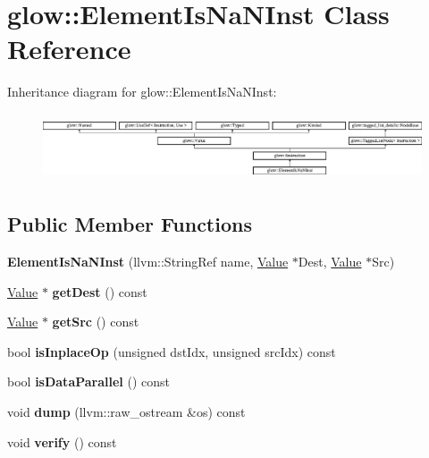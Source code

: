 \hypertarget{classglow_1_1_element_is_na_n_inst}{}\section{glow\+:\+:Element\+Is\+Na\+N\+Inst Class Reference}
\label{classglow_1_1_element_is_na_n_inst}
Inheritance diagram for glow\+:\+:Element\+Is\+Na\+N\+Inst\+:\begin{figure}[H]
\begin{center}
\leavevmode
\includegraphics[height=1.991111cm]{classglow_1_1_element_is_na_n_inst}
\end{center}
\end{figure}
\subsection*{Public Member Functions}
\begin{DoxyCompactItemize}
\item 
\mbox{\label{classglow_1_1_element_is_na_n_inst_a7c13e84e486e559f42c8a6dc14b863c9}} 
{\bfseries Element\+Is\+Na\+N\+Inst} (llvm\+::\+String\+Ref name, \hyperlink{classglow_1_1_value}{Value} $\ast$Dest, \hyperlink{classglow_1_1_value}{Value} $\ast$Src)
\item 
\mbox{\label{classglow_1_1_element_is_na_n_inst_ac9617829c251330a84162ff19b7c0b4c}} 
\hyperlink{classglow_1_1_value}{Value} $\ast$ {\bfseries get\+Dest} () const
\item 
\mbox{\label{classglow_1_1_element_is_na_n_inst_aeede156458edaa561256cdb6f9dd2491}} 
\hyperlink{classglow_1_1_value}{Value} $\ast$ {\bfseries get\+Src} () const
\item 
\mbox{\label{classglow_1_1_element_is_na_n_inst_a9126283bcfa4033a985d3e11facf7a7d}} 
bool {\bfseries is\+Inplace\+Op} (unsigned dst\+Idx, unsigned src\+Idx) const
\item 
\mbox{\label{classglow_1_1_element_is_na_n_inst_a60f07d382016b130896bae128dd51d47}} 
bool {\bfseries is\+Data\+Parallel} () const
\item 
\mbox{\label{classglow_1_1_element_is_na_n_inst_ac92de0e8fc5754f004439e3d41d866a1}} 
void {\bfseries dump} (llvm\+::raw\+\_\+ostream \&os) const
\item 
\mbox{\label{classglow_1_1_element_is_na_n_inst_a61a4587de0bdab2ba0b11d79eaf890fe}} 
void {\bfseries verify} () const
\end{DoxyCompactItemize}
